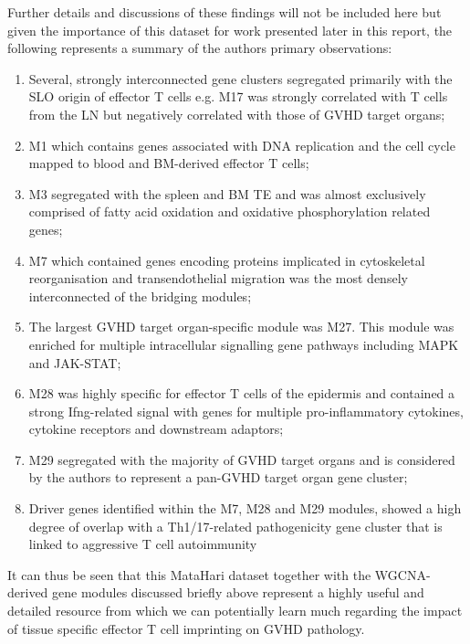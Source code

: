 Further details and discussions of these findings will not be included here but given the importance of this dataset for work presented later in this report, the following represents a summary of the authors primary observations: 

\begin{enumerate}
    \item Several, strongly interconnected gene clusters segregated primarily with the SLO origin of effector T cells e.g. M17 was strongly correlated with T cells from the LN but negatively correlated with those of GVHD target organs; 
    \item M1 which contains genes associated with DNA replication and the cell cycle mapped to blood and BM-derived effector T cells;
    \item M3 segregated with the spleen and BM TE and was almost exclusively comprised of fatty acid oxidation and oxidative phosphorylation related genes;
    \item M7 which contained genes encoding proteins implicated in cytoskeletal reorganisation and transendothelial migration was the most densely interconnected of the bridging modules;
    \item  The largest GVHD target organ-specific module was M27. This module was enriched for multiple intracellular signalling gene pathways including MAPK and JAK-STAT;
    \item M28 was highly specific for effector T cells of the epidermis and contained a strong Ifng-related signal with genes for multiple pro-inflammatory cytokines, cytokine receptors and downstream adaptors;
    \item  M29 segregated with the majority of GVHD target organs and is considered by the authors to represent a pan-GVHD target organ gene cluster;
    \item  Driver genes identified within the M7, M28 and M29 modules, showed a high degree of overlap with a Th1/17-related pathogenicity gene cluster that is linked to aggressive T cell autoimmunity
\end{enumerate}
 
It can thus be seen that this MataHari dataset together with the WGCNA-derived gene modules discussed briefly above represent a highly useful and detailed resource from which we can potentially learn much regarding the impact of tissue specific effector T cell imprinting on GVHD pathology. 
 
